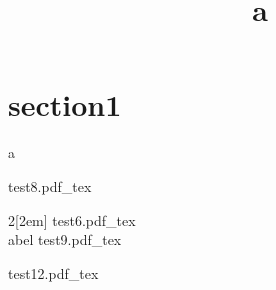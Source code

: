 \documentclass{myclass}
\title{a}
\newcommand{\incfig}[1]{%
  \center
    \def\svgwidth{0.9\columnwidth}
    {#1.pdf_tex}
}
\begin{document}
\maketitle
\tableofcontents
\newpage

\section{section1}
a

\incfig{test8}

\begin{multicols}{2}[\columnsep2em]
\incfig{test6} \\
\columnbreak
abel
\incfig{test9}
\end{multicols}

\incfig{test12}
\end{document}
